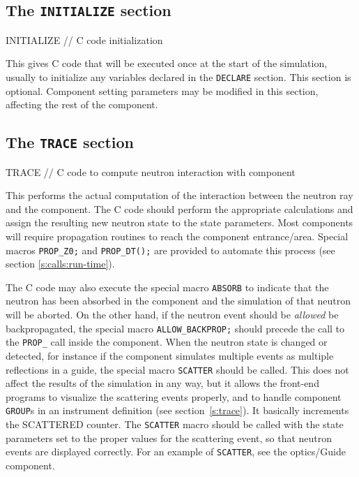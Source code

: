 \subsection{The \texttt{INITIALIZE} section}
\label{s:comp-initialize}

\begin{mcstas}
INITIALIZE
// C code initialization 
\end{mcstas}
 This gives C code that will be executed once at the
start of the simulation, usually to initialize any variables declared in the
\texttt{DECLARE} section. This section is optional. Component setting parameters
may be modified in this section, affecting the rest of the component.


\subsection{The \texttt{TRACE} section}
\label{s:comp-trace}

\begin{mcstas}
TRACE
// C code to compute neutron interaction with component
\end{mcstas}
This performs the actual computation of the interaction between the
neutron ray and the component. The C code should perform the appropriate
calculations and assign the resulting new neutron state to the state
parameters. Most components will require propagation routines to reach the component entrance/area. Special macros \verb+PROP_Z0;+ and \verb+PROP_DT();+ are provided to automate this process (see section \ref{s:calls:run-time}).

The C code may also execute the special macro \texttt{ABSORB} to indicate
that the neutron has been absorbed in the component and the simulation of
that neutron will be aborted. On the other hand, if the neutron event
should be \emph{allowed} be backpropagated, the special macro
\verb+ALLOW_BACKPROP;+ should precede the call to the \verb+PROP_+
call inside the component.
When the neutron state is changed or detected, for
instance if the component simulates multiple events as multiple
reflections in a guide, the
special macro \texttt{SCATTER} should be called. This does not affect the
results of the simulation in any way, but it allows the front-end
programs to visualize the scattering events properly, and to handle
component \texttt{GROUP}s in an instrument definition (see
section~\ref{s:trace}). It basically increments the SCATTERED counter. The \texttt{SCATTER} macro should be called with
the state parameters set to the proper values for the scattering event, so that neutron events are displayed correctly.
For an example of \texttt{SCATTER}, see the optics/Guide
component. 


